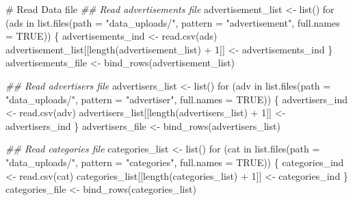 \documentclass[
  letterpaper,
  DIV=11,
  numbers=noendperiod]{scrartcl}
\newenvironment{Shaded}{\begin{snugshade}}{\end{snugshade}}
\newcommand{\AttributeTok}[1]{\textcolor[rgb]{0.40,0.45,0.13}{#1}}
\newcommand{\CommentTok}[1]{\textcolor[rgb]{0.37,0.37,0.37}{#1}}
\newcommand{\ConstantTok}[1]{\textcolor[rgb]{0.56,0.35,0.01}{#1}}
\newcommand{\ControlFlowTok}[1]{\textcolor[rgb]{0.00,0.23,0.31}{#1}}
\newcommand{\DecValTok}[1]{\textcolor[rgb]{0.68,0.00,0.00}{#1}}
\newcommand{\DocumentationTok}[1]{\textcolor[rgb]{0.37,0.37,0.37}{\textit{#1}}}
\newcommand{\FunctionTok}[1]{\textcolor[rgb]{0.28,0.35,0.67}{#1}}
\newcommand{\NormalTok}[1]{\textcolor[rgb]{0.00,0.23,0.31}{#1}}
\newcommand{\OtherTok}[1]{\textcolor[rgb]{0.00,0.23,0.31}{#1}}
\newcommand{\SpecialCharTok}[1]{\textcolor[rgb]{0.37,0.37,0.37}{#1}}
\newcommand{\StringTok}[1]{\textcolor[rgb]{0.13,0.47,0.30}{#1}}
\begin{document}
\begin{Shaded}
\begin{Highlighting}[numbers=left,,]
\CommentTok{\# Read Data file}
\DocumentationTok{\#\# Read advertisements file}
\NormalTok{advertisement\_list }\OtherTok{\textless{}{-}} \FunctionTok{list}\NormalTok{()}
\ControlFlowTok{for}\NormalTok{ (ads }\ControlFlowTok{in} \FunctionTok{list.files}\NormalTok{(}\AttributeTok{path =} \StringTok{"data\_uploads/"}\NormalTok{, }\AttributeTok{pattern =} \StringTok{"advertisement"}\NormalTok{, }\AttributeTok{full.names =} \ConstantTok{TRUE}\NormalTok{)) \{}
\NormalTok{  advertisements\_ind }\OtherTok{\textless{}{-}} \FunctionTok{read.csv}\NormalTok{(ads)}
\NormalTok{  advertisement\_list[[}\FunctionTok{length}\NormalTok{(advertisement\_list) }\SpecialCharTok{+} \DecValTok{1}\NormalTok{]] }\OtherTok{\textless{}{-}}\NormalTok{ advertisements\_ind}
\NormalTok{\}}
\NormalTok{advertisements\_file }\OtherTok{\textless{}{-}} \FunctionTok{bind\_rows}\NormalTok{(advertisement\_list)}

\DocumentationTok{\#\# Read advertisers file}
\NormalTok{advertisers\_list }\OtherTok{\textless{}{-}} \FunctionTok{list}\NormalTok{()}
\ControlFlowTok{for}\NormalTok{ (adv }\ControlFlowTok{in} \FunctionTok{list.files}\NormalTok{(}\AttributeTok{path =} \StringTok{"data\_uploads/"}\NormalTok{, }\AttributeTok{pattern =} \StringTok{"advertiser"}\NormalTok{, }\AttributeTok{full.names =} \ConstantTok{TRUE}\NormalTok{)) \{}
\NormalTok{  advertisers\_ind }\OtherTok{\textless{}{-}} \FunctionTok{read.csv}\NormalTok{(adv)}
\NormalTok{  advertisers\_list[[}\FunctionTok{length}\NormalTok{(advertisers\_list) }\SpecialCharTok{+} \DecValTok{1}\NormalTok{]] }\OtherTok{\textless{}{-}}\NormalTok{ advertisers\_ind}
\NormalTok{\}}
\NormalTok{advertisers\_file }\OtherTok{\textless{}{-}} \FunctionTok{bind\_rows}\NormalTok{(advertisers\_list)}

\DocumentationTok{\#\# Read categories file}
\NormalTok{categories\_list }\OtherTok{\textless{}{-}} \FunctionTok{list}\NormalTok{()}
\ControlFlowTok{for}\NormalTok{ (cat }\ControlFlowTok{in} \FunctionTok{list.files}\NormalTok{(}\AttributeTok{path =} \StringTok{"data\_uploads/"}\NormalTok{, }\AttributeTok{pattern =} \StringTok{"categories"}\NormalTok{, }\AttributeTok{full.names =} \ConstantTok{TRUE}\NormalTok{)) \{}
\NormalTok{  categories\_ind }\OtherTok{\textless{}{-}} \FunctionTok{read.csv}\NormalTok{(cat)}
\NormalTok{  categories\_list[[}\FunctionTok{length}\NormalTok{(categories\_list) }\SpecialCharTok{+} \DecValTok{1}\NormalTok{]] }\OtherTok{\textless{}{-}}\NormalTok{ categories\_ind}
\NormalTok{\}}
\NormalTok{categories\_file }\OtherTok{\textless{}{-}} \FunctionTok{bind\_rows}\NormalTok{(categories\_list)}


\end{Highlighting}
\end{Shaded}
\end{document}
